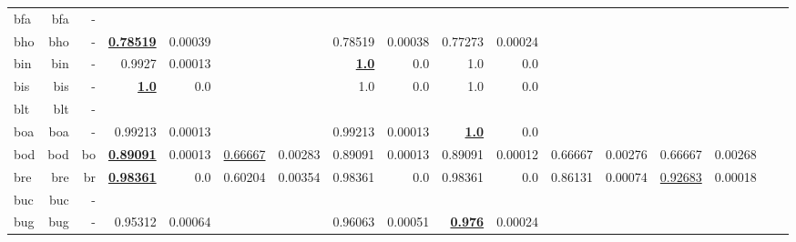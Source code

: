 \documentclass[11pt]{article}
\begin{document}
\begin{table*}[h]
{\begin{tabular}{lrrrrrrrrrrrrrrrr}
bfa         & bfa         & -         &          &          &          &          &          &          &          &          &          &          &          &          \\
bho         & bho         & -         & \textbf{\underline{0.78519}}         & 0.00039         &          &          & 0.78519         & 0.00038         & 0.77273         & 0.00024         &          &          &          &          \\
bin         & bin         & -         & 0.9927         & 0.00013         &          &          & \textbf{\underline{1.0}}         & 0.0         & 1.0         & 0.0         &          &          &          &          \\
bis         & bis         & -         & \textbf{\underline{1.0}}         & 0.0         &          &          & 1.0         & 0.0         & 1.0         & 0.0         &          &          &          &          \\
blt         & blt         & -         &          &          &          &          &          &          &          &          &          &          &          &          \\
boa         & boa         & -         & 0.99213         & 0.00013         &          &          & 0.99213         & 0.00013         & \textbf{\underline{1.0}}         & 0.0         &          &          &          &          \\
bod         & bod         & bo         & \textbf{\underline{0.89091}}         & 0.00013         & \underline{0.66667}         & 0.00283         & 0.89091         & 0.00013         & 0.89091         & 0.00012         & 0.66667         & 0.00276         & 0.66667         & 0.00268         \\
bre         & bre         & br         & \textbf{\underline{0.98361}}         & 0.0         & 0.60204         & 0.00354         & 0.98361         & 0.0         & 0.98361         & 0.0         & 0.86131         & 0.00074         & \underline{0.92683}         & 0.00018         \\
buc         & buc         & -         &          &          &          &          &          &          &          &          &          &          &          &          \\
bug         & bug         & -         & 0.95312         & 0.00064         &          &          & 0.96063         & 0.00051         & \textbf{\underline{0.976}}         & 0.00024         &          &          &          &          \\

\end{tabular}}
\end{table*}
\end{document}
